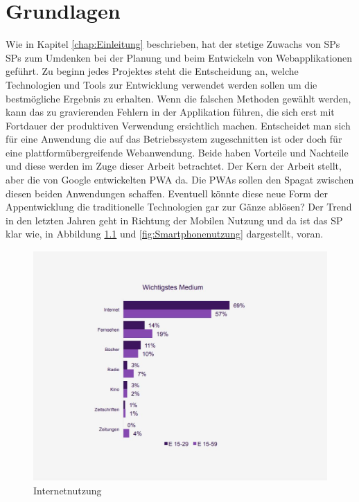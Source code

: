 \chapter{Grundlagen}
\thispagestyle{standard}
\pagestyle{standard}
\renewcommand{\footrulewidth}{0.4pt}

Wie in Kapitel \ref{chap:Einleitung} beschrieben, hat der stetige Zuwachs von \acl{SP}s \acs{SP}s \cite{Geraetenutzung} zum Umdenken bei der Planung und beim Entwickeln von Webapplikationen geführt.
Zu beginn jedes Projektes steht die Entscheidung an, welche Technologien und Tools zur Entwicklung verwendet werden sollen um die bestmögliche Ergebnis zu erhalten.
Wenn die falschen Methoden gewählt werden, kann das zu gravierenden Fehlern in der Applikation führen, die sich erst mit Fortdauer der produktiven Verwendung ersichtlich machen.
Entscheidet man sich für eine Anwendung die auf das Betriebssystem zugeschnitten ist oder doch für eine plattformübergreifende Webanwendung. Beide haben Vorteile und Nachteile und diese werden im Zuge dieser Arbeit betrachtet. Der Kern der Arbeit stellt, aber die von Google entwickelten \acs{PWA} \cite{PWA} da. Die \acs{PWA}s sollen den Spagat zwischen diesen beiden Anwendungen schaffen. Eventuell könnte diese neue Form der Appentwicklung die traditionelle Technologien gar zur Gänze ablösen?
Der Trend in den letzten Jahren geht in Richtung der Mobilen Nutzung und da ist das \acl{SP} klar wie, in Abbildung \ref{fig:Internetnutzung} und \ref{fig:Smartphonenutzung} dargestellt, voran.  

\begin{figure}[h]
	\centering
	\includegraphics[width=14cm]{BilderAllgemein/Internetnutzung}\medskip
	\caption{Internetnutzung \cite{Geraetenutzung}}
	\label{fig:Internetnutzung}
\end{figure}

